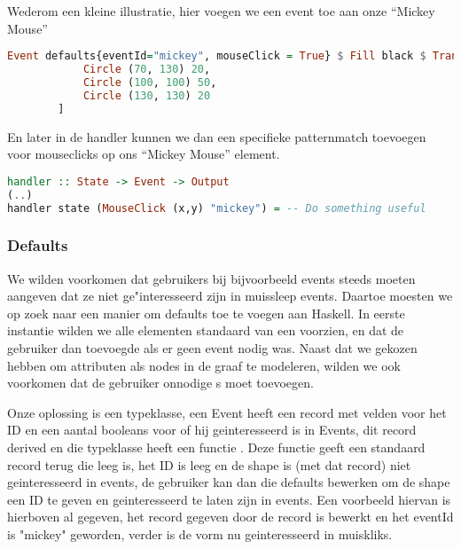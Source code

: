 Wederom een kleine illustratie, hier voegen we een event toe aan onze ``Mickey Mouse''
\begin{lstlisting}[style=densecode, language=Haskell]
Event defaults{eventId="mickey", mouseClick = True} $ Fill black $ Translate 100 100 $ Rotate 90 $ Container 200 200 [
            Circle (70, 130) 20,
            Circle (100, 100) 50,
            Circle (130, 130) 20
        ]
\end{lstlisting}

En later in de handler kunnen we dan een specifieke patternmatch toevoegen voor mouseclicks op ons ``Mickey Mouse'' element.
\begin{lstlisting}[style=densecode, language=Haskell]
handler :: State -> Event -> Output
(..)
handler state (MouseClick (x,y) "mickey") = -- Do something useful
\end{lstlisting}

\subsubsection{Defaults}
We wilden voorkomen dat gebruikers bij bijvoorbeeld events steeds moeten aangeven dat ze niet ge"interesseerd zijn in muissleep events. Daartoe moesten we op zoek naar een manier om defaults toe te voegen aan Haskell. In eerste instantie wilden we alle elementen standaard van een  voorzien, en dat de gebruiker dan  toevoegde als er geen event nodig was. Naast dat we gekozen hebben om attributen als nodes in de graaf te modeleren, wilden we ook voorkomen dat de gebruiker onnodige s moet toevoegen.

Onze oplossing is een  typeklasse, een Event heeft een record met velden voor het ID en een aantal booleans voor of hij geinteresseerd is in Events, dit record derived  en die typeklasse heeft een functie . Deze functie geeft een standaard record terug die leeg is, het ID is leeg en de shape is (met dat record) niet geinteresseerd in events, de gebruiker kan dan die defaults bewerken om de shape een ID te geven en geinteresseerd te laten zijn in events. Een voorbeeld hiervan is hierboven al gegeven, het record gegeven door de  record is bewerkt en het eventId is "mickey" geworden, verder is de vorm nu geinteresseerd in muiskliks.

